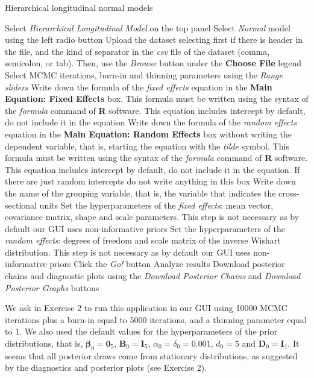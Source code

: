 \begin{algorithm}[h!]
	\caption{Hierarchical longitudinal normal models}\label{alg:HLN}
	\begin{algorithmic}[1]  		 			
		\State Select \textit{Hierarchical Longitudinal Model} on the top panel
		\State Select \textit{Normal} model using the left radio button
		\State Upload the dataset selecting first if there is header in the file, and the kind of separator in the \textit{csv} file of the dataset (comma, semicolon, or tab). Then, use the \textit{Browse} button under the \textbf{Choose File} legend
		\State Select MCMC iterations, burn-in and thinning parameters using the \textit{Range sliders}
		\State Write down the formula of the \textit{fixed effects} equation in the \textbf{Main Equation: Fixed Effects} box. This formula must be written using the syntax of the \textit{formula} command of \textbf{R} software. This equation includes intercept by default, do not include it in the equation
		\State Write down the formula of the \textit{random effects} equation in the \textbf{Main Equation: Random Effects} box without writing the dependent variable, that is, starting the equation with the \textit{tilde} symbol. This formula must be written using the syntax of the \textit{formula} command of \textbf{R} software. This equation includes intercept by default, do not include it in the equation. If there are just random intercepts do not write anything in this box
		\State Write down the name of the grouping variable, that is, the variable that indicates the cross-sectional units 
		\State Set the hyperparameters of the \textit{fixed effects}: mean vector, covariance matrix, shape and scale parameters. This step is not necessary as by default our GUI uses non-informative priors
		\State Set the hyperparameters of the \textit{random effects}: degrees of freedom and scale matrix of the inverse Wishart distribution. This step is not necessary as by default our GUI uses non-informative priors
		\State Click the \textit{Go!} button
		\State Analyze results
		\State Download posterior chains and diagnostic plots using the \textit{Download Posterior Chains} and \textit{Download Posterior Graphs} buttons
	\end{algorithmic} 
\end{algorithm}

We ask in Exercise 2 to run this application in our GUI using 10000 MCMC iterations plus a burn-in equal to 5000 iterations, and a thinning parameter equal to 1. We also used the default values for the hyperparameters of the prior distributions, that is, $\bm{\beta}_0=\bm{0}_5$, $\bm{B}_0=\bm{I}_5$, $\alpha_0=\delta_0=0.001$, $d_0=5$ and $\bm{D}_0=\bm{I}_1$. It seems that all posterior draws come from stationary distributions, as suggested by the diagnostics and posterior plots (see Exercise 2).


